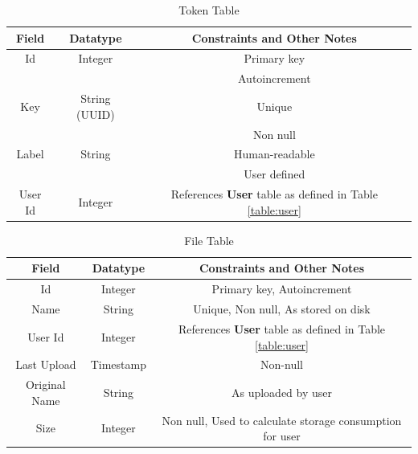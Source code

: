 \documentclass[12pt,a4paper]{report}
\newcommand{\sqlref}[2]{References \textbf{#2} table as defined in Table \ref{#1}}
\begin{document}
\begin{table}[h!]
	\centering
	\caption{Token Table}
	\begin{tabular}{|c|c|c|}
		\hline
		\textbf{Field} & \textbf{Datatype} & \textbf{Constraints and Other Notes} \\
		\hline
		Id             & Integer           & Primary key                          \\
		               &                   & Autoincrement                        \\
		\hline
		Key            & String (UUID)     & Unique                               \\
		               &                   & Non null                             \\
		\hline
		Label          & String            & Human-readable                       \\
		               &                   & User defined                         \\
		\hline
		User Id        & Integer           & \sqlref{table:user}{User}            \\
		\hline
	\end{tabular}
	\label{table:token}
\end{table}
\begin{table}[h!]
	\centering
	\caption{File Table}
	\begin{tabular}{|c|c|c|}
		\hline
		\textbf{Field} & \textbf{Datatype} & \textbf{Constraints and Other Notes}                     \\
		\hline
		Id             & Integer           & Primary key, Autoincrement                               \\
		\hline
		Name           & String            & Unique, Non null, As stored on disk                      \\
		\hline
		User Id        & Integer           & \sqlref{table:user}{User}                                \\
		\hline
		Last Upload    & Timestamp         & Non-null                                                 \\
		\hline
		Original Name  & String            & As uploaded by user                                      \\
		\hline
		Size           & Integer           & Non null, Used to calculate storage consumption for user \\
		\hline
	\end{tabular}
	\label{table:file}
\end{table}
\end{document}
